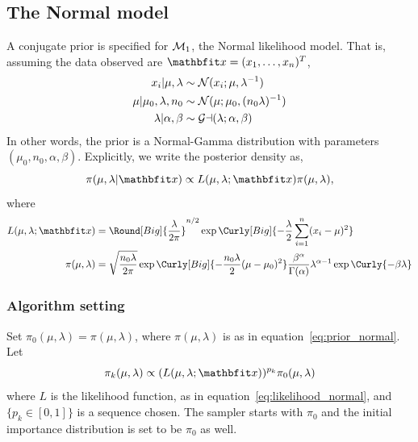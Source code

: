 \subsection{The Normal model}

A conjugate prior is specified for $\mathcal{M}_1$, the Normal likelihood model.
That is, assuming the data observed are $\x = (x_1,\dots,x_n)^T$,
\begin{align}
  x_i | \mu,\lambda &\sim \mathcal{N}(x_i; \mu, \lambda^{-1}) \\
  \mu | \mu_0,\lambda,n_0 &\sim \mathcal{N}(\mu; \mu_0, (n_0\lambda)^{-1}) \\
  \lambda | \alpha,\beta &\sim \mathcal{Ga}(\lambda; \alpha, \beta)
\end{align}
In other words, the prior is a Normal-Gamma distribution with parameters
$(\mu_0, n_0, \alpha, \beta)$. Explicitly, we write the posterior density
as,
\begin{equation}
  \pi(\mu,\lambda|\x) \propto
  L(\mu,\lambda;\x)\pi(\mu,\lambda),
  \label{eq:normal_posterior}
\end{equation}
where
\begin{align}
  L(\mu,\lambda;\x) &= \Round[Big]{\frac{\lambda}{2\pi}}^{n/2}
  \exp\Curly[Big]{-\frac{\lambda}{2}\sum_{i=1}^n(x_i - \mu)^2}
  \label{eq:likelihood_normal}\\
  \pi(\mu,\lambda) &= \sqrt{\frac{n_0\lambda}{2\pi}}
  \exp\Curly[Big]{-\frac{n_0\lambda}{2}(\mu - \mu_0)^2}
  \frac{\beta^{\alpha}}{\Gamma(\alpha)}
  \lambda^{\alpha - 1}\exp\Curly{-\beta\lambda}
  \label{eq:prior_normal}
\end{align}

\subsubsection{Algorithm setting}

Set $\pi_0(\mu,\lambda) = \pi(\mu,\lambda)$, where $\pi(\mu,\lambda)$ is as
in equation~\ref{eq:prior_normal}. Let
\begin{equation}
  \pi_k(\mu,\lambda) \propto (L(\mu,\lambda;\x))^{p_k}\pi_0(\mu,\lambda)
  \label{eq:normal_targets}
\end{equation}
where $L$ is the likelihood function, as in
equation~\eqref{eq:likelihood_normal}, and $\{p_k\in[0,1]\}$ is a sequence
chosen. The \smc sampler starts with $\pi_0$ and the initial importance
distribution is set to be $\pi_0$ as well.

